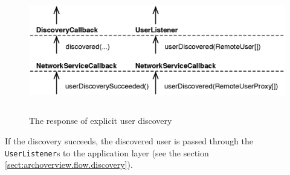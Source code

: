 \begin{figure}[H]
 \centering
 \includegraphics[width=15.63cm,height=5.50cm]{../images/finalreport/architecture_flows/explicitdiscovery_response.eps}
 \caption{The response of explicit user discovery}
 \label{fig:archoverview.flow.explicitdiscoveryresponse}
\end{figure}

If the discovery succeeds, the discovered user is passed through the
\texttt{UserListener}s to the application layer (see the section
\ref{sect:archoverview.flow.discovery}).
